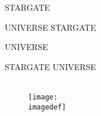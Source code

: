 \thispagestyle{empty}
{
	\vspace*{0.2\textheight}

	\ifbook
		\hfill \huge STARGATE\hspace{2mm}

		\vspace*{8mm}
		
		\hfill UNIVERSE
	\else
		\hfill \huge STARGATE\hspace{22mm}
		
		\vspace*{8mm}
		
		\hfill UNIVERSE\hspace{20mm}
	\fi
}

\cleardoublepage
\thispagestyle{empty}

\ifbook
	\vspace*{1cm}
\else
	\vspace*{5,2cm}
\fi

\begin{center}
	{\Huge STARGATE UNIVERSE}\\
	\vspace{2mm}
	\large{\textit{\titledef}}\\
	\vspace{3mm}
	\begin{figure}[h]
		\centering
			\texttt{[image: \\imagedef]}
	\end{figure}
	\vspace{2mm}
	\large{\authordef}\\
	\normalsize
	\yeardef\\

\end{center}

\newpage

